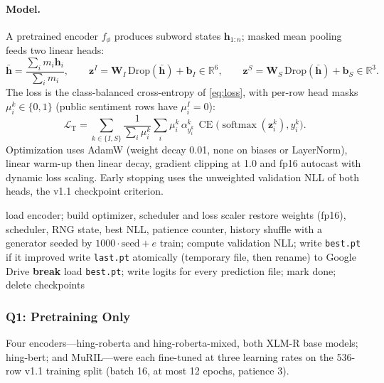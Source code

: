 \documentclass[11pt,a4paper]{article}
\theoremstyle{remark}
\newcommand{\R}{\mathbb{R}}
\newcommand{\W}{\bm{W}}
\newcommand{\bb}{\bm{b}}
\newcommand{\z}{\bm{z}}
\DeclareMathOperator{\softmax}{softmax}
\DeclareMathOperator{\CE}{CE}
\begin{document}
\paragraph{Model.} A pretrained encoder $f_\phi$ produces subword states $\bm h_{1:n}$; masked mean pooling feeds two linear heads:
\begin{equation}
  \bar{\bm h} = \frac{\sum_{i} m_i \bm h_i}{\sum_i m_i},\qquad
  \z^{I} = \W_I\,\mathrm{Drop}(\bar{\bm h}) + \bb_I \in\R^{6},\qquad
  \z^{S} = \W_S\,\mathrm{Drop}(\bar{\bm h}) + \bb_S \in\R^{3}.
  \label{eq:v12teacher}
\end{equation}
The loss is the class-balanced cross-entropy of \cref{eq:loss}, with per-row head masks $\mu^k_i\in\{0,1\}$ (public sentiment rows have $\mu^I_i=0$):
\begin{equation}
  \mathcal{L}_{\text{T}} = \sum_{k\in\{I,S\}} \frac{1}{\sum_i\mu^k_i}\sum_i \mu^k_i\,\alpha^k_{y^k_i}\,\CE\big(\softmax(\z^k_i), y^k_i\big).
  \label{eq:v12teacherloss}
\end{equation}
Optimization uses AdamW (weight decay 0.01, none on biases or LayerNorm), linear warm-up then linear decay, gradient clipping at 1.0 and fp16 autocast with dynamic loss scaling. Early stopping uses the unweighted validation NLL of both heads, the v1.1 checkpoint criterion.

\begin{algorithm}[h]
\caption{Resumable fine-tuning run on a free GPU}
\label{alg:v12resume}
\small
\begin{algorithmic}[1]
 \State \Return {}\EndIf
\State load encoder; build optimizer, scheduler and loss scaler
 \State restore weights (fp16), scheduler, RNG state, best NLL, patience counter, history \EndIf
{}
  \State shuffle with a generator seeded by $1000\cdot\text{seed}+e$ 
  \State train; compute validation NLL; write \texttt{best.pt} if it improved
  \State write \texttt{last.pt} atomically (temporary file, then rename) to Google Drive
   \textbf{break} \EndIf
\EndFor
\State load \texttt{best.pt}; write logits for every prediction file; mark done; delete checkpoints
\end{algorithmic}
\end{algorithm}

\subsubsection{Q1: Pretraining Only}
\label{sec:v12teacher1}
Four encoders---hing-roberta and hing-roberta-mixed, both
XLM-R base models; hing-bert; and
MuRIL---were each fine-tuned at three learning rates on
the 536-row v1.1 training split (batch 16, at most 12 epochs, patience 3).
\end{document}
